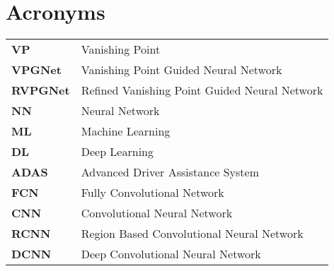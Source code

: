 \chapter*{\centering Acronyms}
\begin{spacing}{1.5}
\setlength{\parskip}{0.3in}

\begin{table}[ht]
\centering
\begin{tabular}{ll}
\textbf{VP} & Vanishing Point \\
\textbf{VPGNet} & Vanishing Point Guided Neural Network \\
\textbf{RVPGNet} & Refined Vanishing Point Guided Neural Network \\
\textbf{NN} & Neural Network \\
\textbf{ML} & Machine Learning \\
\textbf{DL} & Deep Learning \\
\textbf{ADAS} & Advanced Driver Assistance System \\
\textbf{FCN} & Fully Convolutional Network \\
\textbf{CNN} & Convolutional Neural Network \\
\textbf{RCNN} & Region Based Convolutional Neural Network \\
\textbf{DCNN} & Deep Convolutional Neural Network
\end{tabular}%
\end{table}

\end{spacing}
\newpage
